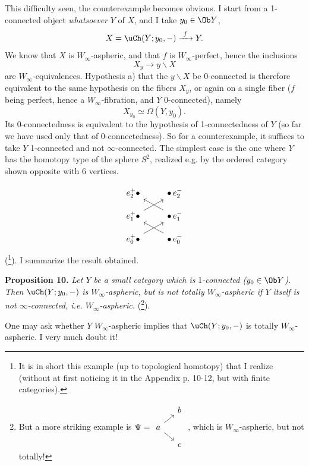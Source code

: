 This difficulty seen, the counterexample becomes obvious. I start from a 1-connected object \textit{whatsoever} $Y$ of $X$, and I take $y_0 \in \Ob Y$,
\[
X = \uCh(Y; y_0, -) \xrightarrow{\ f\ } Y.
\]
We know that $X$ is $W_\infty$-aspheric, and that $f$ is $W_\infty$-perfect, hence the inclusions
\[
X_y \longrightarrow y\backslash X
\]
are $W_\infty$-equivalences. Hypothesis a) that the $y\backslash X$ be 0-connected is therefore equivalent to the same hypothesis on the fibers $X_y$, or
again on a single fiber ($f$ being perfect, hence a $W_\infty$-fibration, and $Y$ 0-connected), namely
\[
X_{y_0} \simeq \Omega(Y, y_0).
\]
Its 0-connectedness is equivalent to the hypothesis of 1-connectedness of $Y$ (so far we have used only that of 0-connectedness). So for a counterexample, it suffices to take $Y$ 1-connected and not $\infty$-connected. The simplest case is the one where $Y$ has the homotopy type of the sphere $S^2$, realized e.g. by the ordered category shown opposite with 6 vertices.

\[
\begin{tikzcd}[row sep=small]
e_2^+ \bullet & \bullet\, e_2^- \\
e_1^+ \bullet \arrow[ur] & \bullet\, e_1^- \arrow[ul] \\
e_0^+ \bullet \arrow[ur] & \bullet\, e_0^- \arrow[ul]
\end{tikzcd}
\]
 (\footnote{It is in short this example (up to topological homotopy) that I realize (without at first noticing it in the Appendix p. 10-12, but with finite categories).}). I summarize the result obtained.

\textbf{Proposition 10.} \textit{Let $Y$ be a small category which is} 1\textit{-connected ($y_0 \in \Ob Y$). Then} $\uCh(Y; y_0, -)$ \textit{is $W_\infty$-aspheric, but is not totally $W_\infty$-aspheric if $Y$ itself is not $\infty$-connected, i.e. $W_\infty$-aspheric.} (\footnote{But a more striking example is $\Psi = \begin{tikzcd}[ampersand replacement=\&, row sep=small, column sep=small, baseline=(A.base)]
 \& b \\
|[alias=A]| a \arrow[ur] \arrow[dr] \& \\
 \& c
\end{tikzcd}$ , which is $W_\infty$-aspheric, but not totally!}).

One may ask whether $Y$ $W_\infty$-aspheric implies that $\uCh(Y; y_0, -)$ is totally $W_\infty$-aspheric. I very much doubt it!

